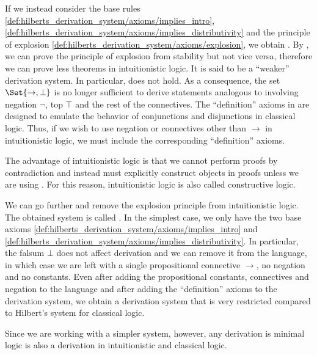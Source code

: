\begin{remark}
\begin{RemEnum}
    If we instead consider the base rules \eqref{def:hilberts_derivation_system/axioms/implies_intro}, \eqref{def:hilberts_derivation_system/axioms/implies_distributivity} and the principle of explosion \eqref{def:hilberts_derivation_system/axioms/explosion}, we obtain . By , we can prove the principle of explosion from stability but not vice versa, therefore we can prove less theorems in intuitionistic logic. It is said to be a \enquote{weaker} derivation system. In particular,  does not hold. As a consequence, the set \( \Set{ \to, \bot } \) is no longer sufficient to derive statements analogous to  involving negation \( \neg \), top \( \top \) and the rest of the connectives. The \enquote{definition} axioms in  are designed to emulate the behavior of conjunctions and disjunctions in classical logic. Thus, if we wish to use negation or connectives other than \( \to \) in intuitionistic logic, we must include the corresponding \enquote{definition} axioms.

    The advantage of intuitionistic logic is that we cannot perform proofs by contradiction and instead must explicitly construct objects in proofs unless we are using . For this reason, intuitionistic logic is also called constructive logic.

     We can go further and remove the explosion principle from intuitionistic logic. The obtained system is called . In the simplest case, we only have the two base axioms \eqref{def:hilberts_derivation_system/axioms/implies_intro} and \eqref{def:hilberts_derivation_system/axioms/implies_distributivity}. In particular, the falsum \( \bot \) does not affect derivation and we can remove it from the language, in which case we are left with a single propositional connective \( \to \), no negation and no constants. Even after adding the propositional constants, connectives and negation to the language and after adding the \enquote{definition} axioms to the derivation system, we obtain a derivation system that is very restricted compared to Hilbert's system for classical logic.

    Since we are working with a simpler system, however, any derivation is minimal logic is also a derivation in intuitionistic and classical logic.
  \end{RemEnum}
\end{remark}

